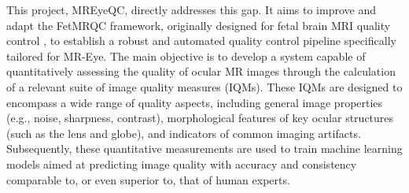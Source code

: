 This project, MREyeQC, directly addresses this gap. It aims to improve and adapt the FetMRQC framework, originally designed for fetal brain MRI quality control \cite{noauthor_medical-image-analysis-laboratoryfetmrqc_sr_nodate}, to establish a robust and automated quality control pipeline specifically tailored for MR-Eye. The main objective is to develop a system capable of quantitatively assessing the quality of ocular MR images through the calculation of a relevant suite of image quality measures (IQMs). These IQMs are designed to encompass a wide range of quality aspects, including general image properties (e.g., noise, sharpness, contrast), morphological features of key ocular structures (such as the lens and globe), and indicators of common imaging artifacts. Subsequently, these quantitative measurements are used to train machine learning models aimed at predicting image quality with accuracy and consistency comparable to, or even superior to, that of human experts.
